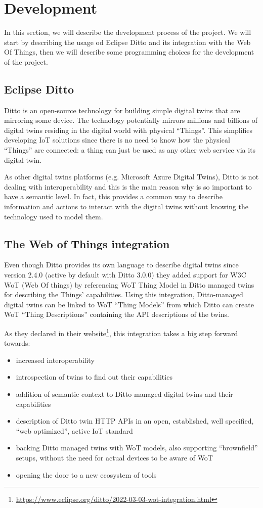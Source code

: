 \chapter{Development}
In this section, we will describe the development process of the project. We will start by describing the usage od Eclipse Ditto and its integration with the Web Of Things, then we will describe some programming choices for the development of the project.

\section{Eclipse Ditto}
Ditto is an open-source technology for building simple digital twins that are mirroring some device.
The technology potentially mirrors millions and billions of digital twins residing in the digital world with physical “Things”.
This simplifies developing IoT solutions since there is no need to know how the physical “Things” are connected:
a thing can just be used as any other web service via its digital twin.

As other digital twins platforms (e.g. Microsoft Azure Digital Twins), Ditto is not dealing with interoperability and this is the main reason why is so important to have a semantic level.
In fact, this provides a common way to describe information and actions to interact with the digital twins without knowing the technology used to model them.

\section{The Web of Things integration}
Even though Ditto provides its own language to describe digital twins  since version 2.4.0 (active by default with Ditto 3.0.0) they added support for W3C WoT (Web Of things) by referencing WoT Thing Model in Ditto managed twins for describing the Things' capabilities.
Using this integration, Ditto-managed digital twins can be linked to WoT ``Thing Models'' from which Ditto can create WoT “Thing Descriptions” containing the API descriptions of the twins.

As they declared in their website\footnote{\url{https://www.eclipse.org/ditto/2022-03-03-wot-integration.html}}, this integration takes a big step forward towards:
\begin{itemize}
    \item increased interoperability
    \item introspection of twins to find out their capabilities
    \item addition of semantic context to Ditto managed digital twins and their capabilities
    \item description of Ditto twin HTTP APIs in an open, established, well specified, “web optimized”, active IoT standard
    \item backing Ditto managed twins with WoT models, also supporting “brownfield” setups, without the need for actual devices to be aware of WoT
    \item opening the door to a new ecosystem of tools
\end{itemize}

